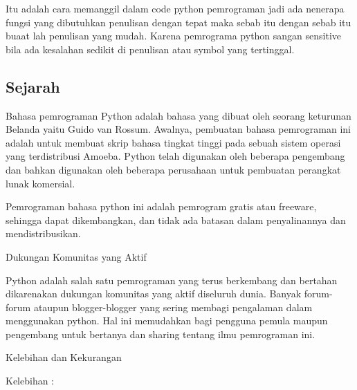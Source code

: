 {{{{{{{{\vspace{14pt}
\noindent 
{\fontsize{14pt}{14pt}\selectfont Itu adalah cara memanggil dalam code python pemrograman jadi ada nenerapa fungsi yang dibutuhkan penulisan dengan tepat maka sebab itu dengan sebab itu buaat lah penulisan yang mudah. Karena pemrograma python sangan sensitive bila ada kesalahan sedikit di penulisan atau symbol yang tertinggal. \\} \par
\vspace{14pt}
\vspace{14pt}
\noindent 
{\fontsize{14pt}{14pt}\subsection {Sejarah}
\noindent 
{\fontsize{14pt}{14pt}\selectfont Bahasa pemrograman Python adalah bahasa yang dibuat oleh seorang keturunan Belanda yaitu Guido van Rossum. Awalnya, pembuatan bahasa pemrograman ini adalah untuk membuat skrip bahasa tingkat tinggi pada sebuah sistem operasi yang terdistribusi Amoeba. Python telah digunakan oleh beberapa pengembang dan bahkan digunakan oleh beberapa perusahaan untuk pembuatan perangkat lunak komersial. \\} \par
\noindent 
{\fontsize{14pt}{14pt}\selectfont Pemrograman bahasa python ini adalah pemrogram gratis atau freeware, sehingga dapat dikembangkan, dan tidak ada batasan dalam penyalinannya dan mendistribusikan. \\} \par
\vspace{14pt}
\noindent 
{\fontsize{14pt}{14pt}\selectfont Dukungan Komunitas yang Aktif \\} \par
\noindent 
{\fontsize{14pt}{14pt}\selectfont Python adalah salah satu pemrograman yang terus berkembang dan bertahan dikarenakan dukungan komunitas yang aktif diseluruh dunia. Banyak forum-forum ataupun blogger-blogger yang sering membagi pengalaman dalam menggunakan python. Hal ini memudahkan bagi pengguna pemula maupun pengembang untuk bertanya dan sharing tentang ilmu pemrograman ini. \\} \par
\noindent 
{\fontsize{14pt}{14pt}\selectfont Kelebihan dan Kekurangan \\} \par
\vspace{14pt}
\noindent 
{\fontsize{14pt}{14pt}\selectfont Kelebihan : \\} \par
}}}}}}}}}
